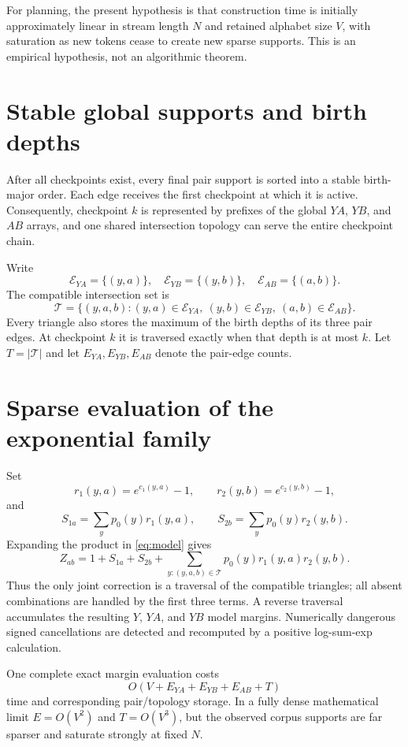 \documentclass[11pt]{article}
\newcommand{\E}{\mathcal E}
\newcommand{\T}{\mathcal T}
\begin{document}
For planning, the present hypothesis is that construction time is initially
approximately linear in stream length $N$ and retained alphabet size $V$,
with saturation as new tokens cease to create new sparse supports.  This is
an empirical hypothesis, not an algorithmic theorem.

\section{Stable global supports and birth depths}

After all checkpoints exist, every final pair support is sorted into a stable
birth-major order.  Each edge receives the first checkpoint at which it is
active.  Consequently, checkpoint $k$ is represented by prefixes of the
global $YA$, $YB$, and $AB$ arrays, and one shared intersection topology can
serve the entire checkpoint chain.

Write
\[
 \E_{YA}=\{(y,a)\},\quad
 \E_{YB}=\{(y,b)\},\quad
 \E_{AB}=\{(a,b)\}.
\]
The compatible intersection set is
\begin{equation}
 \T=\{(y,a,b):(y,a)\in\E_{YA},\ (y,b)\in\E_{YB},\
                    (a,b)\in\E_{AB}\}.
 \label{eq:triangles}
\end{equation}
Every triangle also stores the maximum of the birth depths of its three pair
edges.  At checkpoint $k$ it is traversed exactly when that depth is at most
$k$.  Let $T=|\T|$ and let $E_{YA},E_{YB},E_{AB}$ denote the pair-edge
counts.

\section{Sparse evaluation of the exponential family}

Set
\[
 r_1(y,a)=e^{c_1(y,a)}-1,
 \qquad
 r_2(y,b)=e^{c_2(y,b)}-1,
\]
and
\[
 S_{1a}=\sum_y p_0(y)r_1(y,a),
 \qquad
 S_{2b}=\sum_y p_0(y)r_2(y,b).
\]
Expanding the product in \eqref{eq:model} gives
\begin{equation}
 Z_{ab}=1+S_{1a}+S_{2b}
 +\sum_{y:(y,a,b)\in\T}p_0(y)r_1(y,a)r_2(y,b).
 \label{eq:sparseZ}
\end{equation}
Thus the only joint correction is a traversal of the compatible triangles;
all absent combinations are handled by the first three terms.  A reverse
traversal accumulates the resulting $Y$, $YA$, and $YB$ model margins.
Numerically dangerous signed cancellations are detected and recomputed by a
positive log-sum-exp calculation.

One complete exact margin evaluation costs
\[
 O(V+E_{YA}+E_{YB}+E_{AB}+T)
\]
time and corresponding pair/topology storage.  In a fully dense mathematical
limit $E=O(V^2)$ and $T=O(V^3)$, but the observed corpus supports are far
sparser and saturate strongly at fixed $N$.
\end{document}
